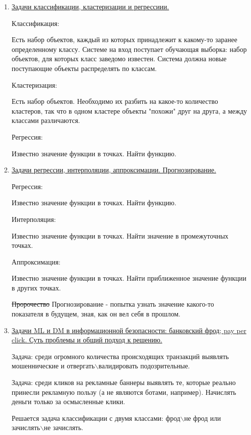 \documentclass{proc}
\begin{document}
	
	\begin{enumerate}
		
		
		\item \uline{Задачи классификации, кластеризации и регрессиии.}
		
		Классификация:
		
		Есть набор объектов, каждый из которых принадлежит к какому-то заранее определенному классу. Системе на вход поступает обучающая выборка: набор объектов, для которых класс заведомо известен. Система должна новые поступающие объекты распределять по классам.
		
		Кластеризация:
		
		Есть набор объектов. Необходимо их разбить на какое-то количество кластеров, так что в одном кластере объекты "похожи" друг на друга, а между классами различаются.
		
		Регрессия:
		
		Известно значение функции в точках. Найти функцию.
		
		\item \uline{Задачи регрессии, интерполяции, аппроксимации. Прогнозирование.}
		
		Регрессия:
		
		Известно значение функции в точках. Найти функцию.
		
		Интерполяция:
		
		Известно значение функции в точках. Найти значение в промежуточных точках.
		
		Аппроксимация:
		
		Известно значение функции в точках. Найти приближенное значение функции в других точках.
		
		\sout{Пророчество} Прогнозирование - попытка узнать значение какого-то показателя в будущем, зная, как он вел себя в прошлом.
		
		\item \uline{Задачи ML и DM в информационной безопасности: банковский фрод; pay per click. Суть проблемы и общий подход к решению.}
		
		Задача: среди огромного количества происходящих транзакций выявлять мошеннические и отвергать$\backslash$валидировать подозрительные.
		
		Задача: среди кликов на рекламные баннеры выявлять те, которые реально принесли рекламную пользу (а не являются ботами, например). Начислять деньги только за осмысленные клики.
		
		Решается задача классификации с двумя классами: фрод$\backslash$не фрод или зачислять$\backslash$не зачислять.
		

\end{enumerate}
\end{document}
